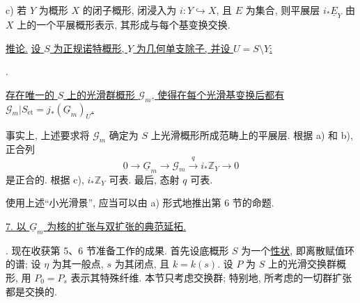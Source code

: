 \smallskip
\noindent c) 若 $Y$ 为概形 $X$ 的闭子概形, 闭浸入为 $i:Y\hookrightarrow X$, 且 $E$ 为集合, 则平展层 $i_*\underline E_Y$ 由 $X$ 上的一个平展概形表示, 其形成与每个基变换交换.

\medskip
\noindent\underline{推论.} \underline{设 $S$ 为正规诺特概形, $Y$ 为几何单支除子, 并设 $U=S\setminus Y$:}
\begin{center}
\qquad .
\end{center}
\underline{存在唯一的 $S$ 上的光滑群概形 $\mathcal G_m$, 使得在每个光滑基变换后都有 $\mathcal G_m|S_{\mathrm{\acute{e}t}}=j_*(\underline G_m)_U$.}

事实上, 上述要求将 $\mathcal G_m$ 确定为 $S$ 上光滑概形所成范畴上的平展层. 根据 a) 和 b), 正合列
\[
 0\longrightarrow\underline G_m\longrightarrow\mathcal G_m
 \xrightarrow{\ q\ }i_*\mathbb Z_Y\longrightarrow0
\]
是正合的. 根据 c), $i_*\mathbb Z_Y$ 可表. 最后, 态射 $q$ 可表.

使用上述“小光滑景”, 应当可以由 a) 形式地推出第 6 节的命题.



\medskip
\noindent\underline{7. 以 $\underline G_m$ 为核的扩张与双扩张的典范延拓.}

\medskip
\noindent {}. 现在收获第 5、6 节准备工作的成果. 首先设底概形 $S$ 为一个\underline{性状}, 即离散赋值环的谱; 设 $\eta$ 为其一般点, $s$ 为其闭点, 且 $k=k(s)$. 设 $P$ 为 $S$ 上的光滑交换群概形, 用 $P_0=P_s$ 表示其特殊纤维. 本节只考虑交换群; 特别地, 所考虑的一切群扩张都是交换的.

